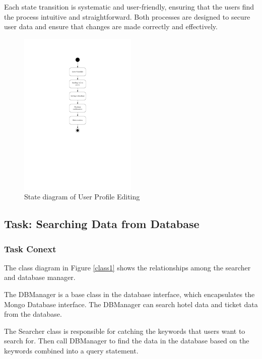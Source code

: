 \documentclass[conference]{IEEEtran}
\begin{document}
Each state transition is systematic and user-friendly, ensuring that the users find the process intuitive and straightforward. Both processes are designed to secure user data and ensure that changes are made correctly and effectively.
\begin{figure}[htbp]
	\centerline{\includegraphics[width=0.5\textwidth]{Diagram_of_Editing_Info_and_Password/State_diagram_of_editing_info.pdf}}
	\caption{State diagram of  User Profile Editing}
	\label{State_diagram_of_editing_info}
\end{figure}


\subsection{\textbf{Task: Searching Data from Database }}


\subsubsection{\textbf{Task Conext }}

\textbf{}

The class diagram in Figure \ref{class1} shows the relationships among the searcher and database manager. 

The DBManager is a base class in the database interface, which encapsulates the Mongo Database interface. The DBManager can search hotel data and ticket data from the database.

The Searcher class is responsible for catching the keywords that users want to search for. Then call DBManager to find the data in the database based on the keywords combined into a query statement.
\end{document}
